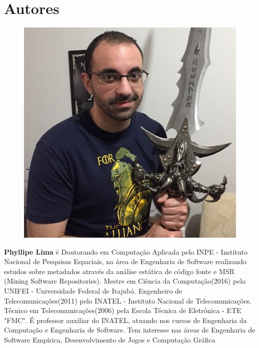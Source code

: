 \section*{Autores}

\begin{figure}
\includegraphics[width=\linewidth]{figuras/autor1.png}
\end{figure}

    \textbf{Phyllipe Lima} é Doutorando em Computação Aplicada pelo INPE - Instituto Nacional de Pesquisas Espaciais, na área de Engenharia de Software realizando estudos sobre metadados através da análise estática de código fonte e MSR (Mining Software Repositories). Mestre em Ciência da Computação(2016) pela UNIFEI - Universidade Federal de Itajubá. Engenheiro de Telecomunicações(2011) pelo INATEL - Instituto Nacional de Telecomunicações.  Técnico em Telecomunicações(2006) pela Escola Técnica de Eletrônica - ETE "FMC". É professor auxiliar do INATEL, atuando nos cursos de Engenharia da Computação e Engenharia de Software. Tem interesse nas áreas de Engenharia de Software Empírica, Desenvolvimento de Jogos e Computação Gráfica\newline

